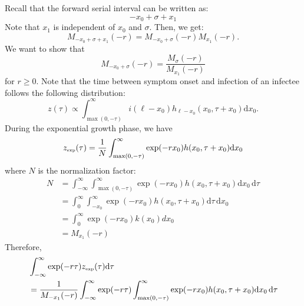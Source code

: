 \documentclass[12pt]{article}
\begin{document}
Recall that the forward serial interval can be written as:
\begin{equation}
- x_0 + \sigma + x_1
\end{equation}
Note that $x_1$ is independent of $x_0$ and $\sigma$. Then, we get:
\begin{equation}
M_{- x_0 + \sigma + x_1}(-r) = M_{- x_0 + \sigma}(-r) M_{x_1}(-r).
\end{equation}
We want to show that 
\begin{equation}
M_{- x_0 + \sigma}(-r)= \frac{M_\sigma(-r)}{M_{x_1}(-r)}
\end{equation}
for $r \geq 0$.
Note that the time between symptom onset and infection of an infectee follows the following distribution:
\begin{equation}
z(\tau) \propto \int_{\max(0, -\tau)}^\infty i(\ell - x_0) h_{\ell - x_0}(x_0, \tau+x_0) \mathrm{d} x_0.
\end{equation}
During the exponential growth phase, we have
\begin{equation}
\begin{aligned}
z_{\textrm{\tiny exp}}(\tau) &= \frac{1}{N} \int_{\max(0, -\tau)}^\infty \exp(- r x_0) h(x_0, \tau+x_0) \mathrm{d} x_0\\
\end{aligned}
\end{equation}
where $N$ is the normalization factor:
\begin{equation}
\begin{aligned}
N &= \int_{-\infty}^\infty \int_{\max(0, -\tau)}^\infty \exp(- r x_0) h(x_0, \tau+x_0) \mathrm{d} x_0\,\mathrm{d}\tau\\
&= \int_{0}^\infty \int_{-x_0}^\infty \exp(- r x_0) h(x_0, \tau+x_0) \mathrm{d}\tau\,\mathrm{d} x_0\\
&= \int_{0}^\infty \exp(- r x_0) k(x_0) dx_0\\
&= M_{x_1}(-r)
\end{aligned}
\end{equation}
Therefore,
\begin{equation}
\begin{aligned}
&\int_{-\infty}^{\infty} \exp(-r\tau) z_{\textrm{\tiny exp}}(\tau) \mathrm{d}\tau\\
&=\frac{1}{M_{-x_1}(-r)} \int_{-\infty}^{\infty} \exp(-r\tau) \int_{\max(0, -\tau)}^\infty \exp(- r x_0) h(x_0, \tau+x_0) \mathrm{d} x_0\, \mathrm{d}\tau
\end{aligned}
\end{equation}
\end{document}
